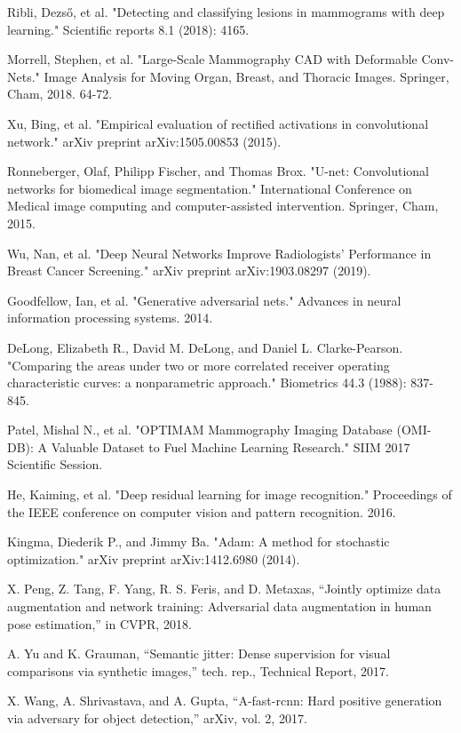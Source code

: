 \documentclass{article}
\begin{document}
\begin{thebibliography}{}
Ribli, Dezső, et al. "Detecting and classifying lesions in mammograms with deep learning." Scientific reports 8.1 (2018): 4165.

Morrell, Stephen, et al. "Large-Scale Mammography CAD with Deformable Conv-Nets." Image Analysis for Moving Organ, Breast, and Thoracic Images. Springer, Cham, 2018. 64-72.

Xu, Bing, et al. "Empirical evaluation of rectified activations in convolutional network." arXiv preprint arXiv:1505.00853 (2015).

Ronneberger, Olaf, Philipp Fischer, and Thomas Brox. "U-net: Convolutional networks for biomedical image segmentation." International Conference on Medical image computing and computer-assisted intervention. Springer, Cham, 2015.

Wu, Nan, et al. "Deep Neural Networks Improve Radiologists' Performance in Breast Cancer Screening." arXiv preprint arXiv:1903.08297 (2019).

Goodfellow, Ian, et al. "Generative adversarial nets." Advances in neural information processing systems. 2014.

DeLong, Elizabeth R., David M. DeLong, and Daniel L. Clarke-Pearson. "Comparing the areas under two or more correlated receiver operating characteristic curves: a nonparametric approach." Biometrics 44.3 (1988): 837-845.

Patel, Mishal N., et al. "OPTIMAM Mammography Imaging Database (OMI-DB): A Valuable Dataset to Fuel Machine Learning Research." SIIM 2017 Scientific Session.

He, Kaiming, et al. "Deep residual learning for image recognition." Proceedings of the IEEE conference on computer vision and pattern recognition. 2016.

Kingma, Diederik P., and Jimmy Ba. "Adam: A method for stochastic optimization." arXiv preprint arXiv:1412.6980 (2014).

X. Peng, Z. Tang, F. Yang, R. S. Feris, and D. Metaxas, “Jointly optimize data
augmentation and network training: Adversarial data augmentation in human pose
estimation,” in CVPR, 2018.

A. Yu and K. Grauman, “Semantic jitter: Dense supervision for visual comparisons
via synthetic images,” tech. rep., Technical Report, 2017.

X. Wang, A. Shrivastava, and A. Gupta, “A-fast-rcnn: Hard positive generation
via adversary for object detection,” arXiv, vol. 2, 2017.


\end{thebibliography}
\end{document}
